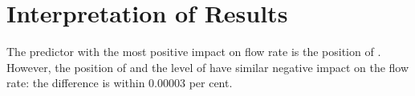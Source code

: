 \newpage
\section{Interpretation of Results}

The predictor with the most positive impact on flow rate is the position of . However, the position of  and the level of  have similar negative impact on the flow rate: the difference is within 0.00003 per cent.